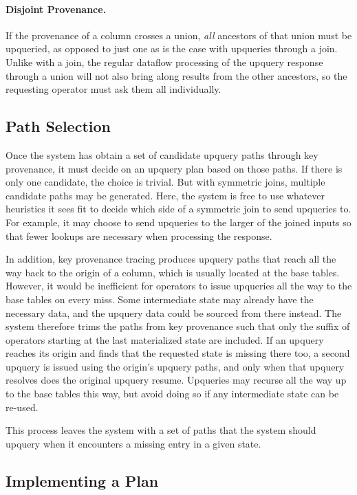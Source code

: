 \paragraph{Disjoint Provenance.}
If the provenance of a column crosses a union, \emph{all} ancestors of that
union must be upqueried, as opposed to just one as is the case with upqueries
through a join. Unlike with a join, the regular dataflow processing of the
upquery response through a union will not also bring along results from the
other ancestors, so the requesting operator must ask them all individually.

\subsection{Path Selection}

Once the system has obtain a set of candidate upquery paths through key
provenance, it must decide on an upquery plan based on those paths. If there is
only one candidate, the choice is trivial. But with symmetric joins, multiple
candidate paths may be generated. Here, the system is free to use whatever
heuristics it sees fit to decide which side of a symmetric join to send
upqueries to. For example, it may choose to send upqueries to the larger of the
joined inputs so that fewer lookups are necessary when processing the response.

In addition, key provenance tracing produces upquery paths that reach all the
way back to the origin of a column, which is usually located at the base tables.
However, it would be inefficient for operators to issue upqueries all the way to
the base tables on every miss. Some intermediate state may already have the
necessary data, and the upquery data could be sourced from there instead. The
system therefore trims the paths from key provenance such that only the suffix
of operators starting at the last materialized state are included. If an upquery
reaches its origin and finds that the requested state is missing there too, a
second upquery is issued using the origin's upquery paths, and only when that
upquery resolves does the original upquery resume. Upqueries may recurse all the
way up to the base tables this way, but avoid doing so if any intermediate state
can be re-used.

This process leaves the system with a set of paths that the system should
upquery when it encounters a missing entry in a given state.

\subsection{Implementing a Plan}

